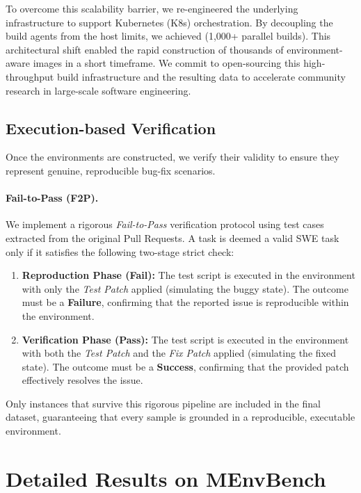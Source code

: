 \documentclass{article}
\theoremstyle{plain}
\theoremstyle{definition}
\theoremstyle{remark}
\begin{document}
To overcome this scalability barrier, we re-engineered the underlying infrastructure to support Kubernetes (K8s) orchestration. By decoupling the build agents from the host limits, we achieved (1,000+ parallel builds). This architectural shift enabled the rapid construction of thousands of environment-aware images in a short timeframe. We commit to open-sourcing this high-throughput build infrastructure and the resulting data to accelerate community research in large-scale software engineering.

\subsection{Execution-based Verification}
Once the environments are constructed, we verify their validity to ensure they represent genuine, reproducible bug-fix scenarios.

\paragraph{Fail-to-Pass (F2P).}
We implement a rigorous \textit{Fail-to-Pass} verification protocol using test cases extracted from the original Pull Requests. A task is deemed a valid SWE task only if it satisfies the following two-stage strict check:
\begin{enumerate}
    \item \textbf{Reproduction Phase (Fail):} The test script is executed in the environment with only the \textit{Test Patch} applied (simulating the buggy state). The outcome must be a \textbf{Failure}, confirming that the reported issue is reproducible within the environment.
    \item \textbf{Verification Phase (Pass):} The test script is executed in the environment with both the \textit{Test Patch} and the \textit{Fix Patch} applied (simulating the fixed state). The outcome must be a \textbf{Success}, confirming that the provided patch effectively resolves the issue.
\end{enumerate}

Only instances that survive this rigorous pipeline are included in the final dataset, guaranteeing that every sample is grounded in a reproducible, executable environment.

\section{Detailed Results on MEnvBench}\label{append:detailed_results}
\end{document}
